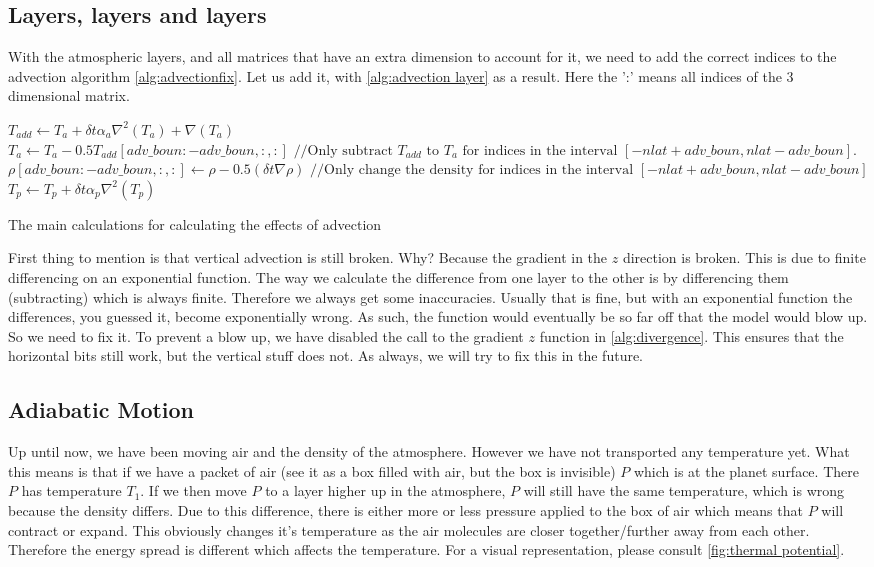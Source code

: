 \subsection{Layers, layers and layers}
With the atmospheric layers, and all matrices that have an extra dimension to account for it, we need to add the correct indices to the advection algorithm \autoref{alg:advectionfix}. Let us 
add it, with \autoref{alg:advection layer} as a result. Here the ':' means all indices of the 3 dimensional matrix. 

\begin{algorithm}
    $T_{add} \leftarrow T_a + \delta t \alpha_a \nabla^2(T_a) + \nabla(T_a)$ \;
    $T_a \leftarrow T_a - 0.5T_{add}[adv\_boun:-adv\_boun, :, :] \text{ //Only subtract } T_{add} \text{ to } T_a \text{ for indices in the interval } [-nlat + adv\_boun, nlat - adv\_boun]$. \;
    $\rho[adv\_boun: -adv\_boun, :, :] \leftarrow \rho - 0.5(\delta t \nabla \rho) \text{ //Only change the density for indices in the interval } [-nlat + adv\_boun, nlat - adv\_boun]$ \;
    $T_p \leftarrow T_p + \delta t \alpha_p \nabla^2(T_p)$ \;
    \caption{The main calculations for calculating the effects of advection}
    \label{alg:advection layer}
\end{algorithm}

First thing to mention is that vertical advection is still broken. Why? Because the gradient in the $z$ direction is broken. This is due to finite differencing on an exponential function. The way
we calculate the difference from one layer to the other is by differencing them (subtracting) which is always finite. Therefore we always get some inaccuracies. Usually that is fine, but with an 
exponential function the differences, you guessed it, become exponentially wrong. As such, the function would eventually be so far off that the model would blow up. So we need to fix it. To 
prevent a blow up, we have disabled the call to the gradient $z$ function in \autoref{alg:divergence}. This ensures that the horizontal bits still work, but the vertical stuff does not.
As always, we will try to fix this in the future. 

\subsection{Adiabatic Motion} \label{sec:thermal pot}
Up until now, we have been moving air and the density of the atmosphere. However we have not transported any temperature yet. What this means is that if we have a packet of air (see it as a box
filled with air, but the box is invisible) $P$ which is at the planet surface. There $P$ has temperature $T_1$. If we then move $P$ to a layer higher up in the atmosphere, $P$ will still have 
the same temperature, which is wrong because the density differs. Due to this difference, there is either more or less pressure applied to the box of air which means that $P$ will contract or 
expand. This obviously changes it's temperature as the air molecules are closer together/further away from each other. Therefore the energy spread is different which affects the temperature. 
For a visual representation, please consult \autoref{fig:thermal potential}.

